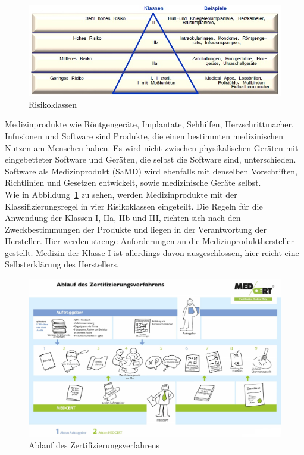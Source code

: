 \begin{figure}[h]
    \centering
    \includegraphics[width=1.0\textwidth]{images/Risikoklassen.jpg}
    \caption{\label{fig:Marktzugangsregelung}
        Risikoklassen
        \protect\cite{Marktzugangsregelung}
    }
\end{figure}
Medizinprodukte wie Röntgengeräte, Implantate, Sehhilfen, Herzschrittmacher, 
Infusionen und Software sind Produkte, die einen bestimmten medizinischen Nutzen am Menschen haben\cite{Marktzugangsregelung}.
Es wird nicht zwischen physikalischen Geräten mit eingebetteter Software und Geräten, die selbst die Software sind, unterschieden. 
Software als Medizinprodukt (SaMD) wird ebenfalls mit denselben Vorschriften, Richtlinien und Gesetzen entwickelt, sowie medizinische Geräte selbst\cite{AI_in_EU}.\\
Wie in Abbildung~\ref{fig:Marktzugangsregelung} zu sehen, werden Medizinprodukte mit der Klassifizierungsregel in vier Risikoklassen eingeteilt.
Die Regeln für die Anwendung der Klassen I, IIa, IIb und III, 
richten sich nach den Zweckbestimmungen der Produkte und liegen in der Verantwortung der Hersteller\cite{Marktzugangsregelung}. Hier werden strenge Anforderungen an die Medizinprodukthersteller gestellt. 
Medizin der Klasse I ist allerdings davon ausgeschlossen, hier reicht eine Selbsterklärung des Herstellers.
\newpage
\begin{figure}[h]
    \centering
    \includegraphics[width=1.0\textwidth]{images/Zertifizierungsablauf.jpg}
    \caption{\label{fig:Zertifizierungsablauf}
        Ablauf des Zertifizierungsverfahrens
        \protect{}
    }
\end{figure}
